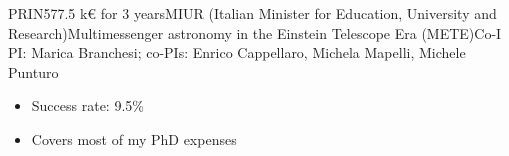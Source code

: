 %
%
%


\begin{experiences}
     {PRIN}{577.5 k€ for 3 years}{MIUR (Italian Minister for Education, University and Research)}{Multimessenger astronomy in the Einstein Telescope Era (METE)}{Co-I} {PI: Marica Branchesi; co-PIs: Enrico Cappellaro, Michela Mapelli, Michele Punturo}{ 
    \begin{itemize}
        \item Success rate: 9.5\%
        \item Covers most of my PhD expenses
    \end{itemize}
    }
\end{experiences}